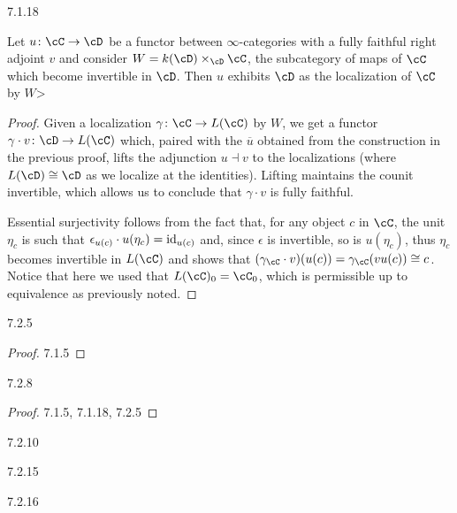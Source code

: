 \documentclass[a4paper,12pt]{scrartcl}
\begin{document}
\begin{prop}
  7.1.18

  Let $u\colon\cC\rightarrow\cD$ be a functor between $\infty$-categories with a
  fully faithful right adjoint $v$ and consider $W=k(\cD)\times_\cD\cC$, the
  subcategory of maps of $\cC$ which become invertible in $\cD$. Then $u$
  exhibits $\cD$ as the localization of $\cC$ by $W$>
\end{prop}
\begin{proof}
  Given a localization $\gamma\colon\cC\rightarrow L(\cC)$ by $W$, we get a
  functor $\gamma\cdot v\colon\cD\rightarrow L(\cC)$ which, paired with the
  $\overline{u}$ obtained from the construction in the previous proof, lifts the
  adjunction $u\dashv v$ to the localizations (where $L(\cD)\cong\cD$ as we
  localize at the identities). Lifting maintains the counit invertible, which
  allows us to conclude that $\gamma\cdot v$ is fully faithful.

  Essential surjectivity
  follows from the fact that, for any object $c$ in $\cC$, the unit $\eta_c$ is
  such that $\epsilon_{u(c)}\cdot u(\eta_c)=\operatorname{id}_{u(c)}$ and, since $\epsilon$ is
  invertible, so is $u(\eta_c)$, thus $\eta_c$ becomes invertible in $L(\cC)$
  and shows that $(\gamma_{\cC}\cdot v)(u(c))=\gamma_{\cC}(vu(c))\cong c$.
  Notice that here we used that $L(\cC)_0=\cC_0$, which is permissible up to
  equivalence as previously noted.

\end{proof}

\begin{cor}
  7.2.5
\end{cor}
\begin{proof}
  7.1.5
\end{proof}

\begin{cor}
  7.2.8
\end{cor}
\begin{proof}
  7.1.5, 7.1.18, 7.2.5
\end{proof}

\begin{cor}
  7.2.10
\end{cor}

\begin{cor}
  7.2.15
\end{cor}

\begin{cor}
  7.2.16
\end{cor}
\end{document}
